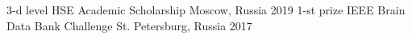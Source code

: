 \begin{cvhonors}
  \cvhonor
    {3-d level HSE Academic Scholarship}
    {}
    {Moscow, Russia}
    {2019}
  \cvhonor
    {1-st prize}
    {IEEE Brain Data Bank Challenge}
    {St. Petersburg, Russia}
    {2017}
\end{cvhonors}

